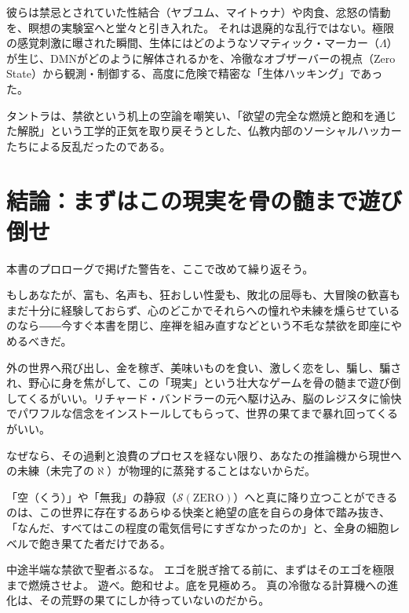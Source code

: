 彼らは禁忌とされていた性結合（ヤブユム、マイトゥナ）や肉食、忿怒の情動を、瞑想の実験室へと堂々と引き入れた。
それは退廃的な乱行ではない。極限の感覚刺激に曝された瞬間、生体にはどのようなソマティック・マーカー（$\Lambda$）が生じ、DMNがどのように解体されるかを、冷徹なオブザーバーの視点（Zero State）から観測・制御する、高度に危険で精密な「生体ハッキング」であった。

タントラは、禁欲という机上の空論を嘲笑い、「欲望の完全な燃焼と飽和を通じた解脱」という工学的正気を取り戻そうとした、仏教内部のソーシャルハッカーたちによる反乱だったのである。

\section{結論：まずはこの現実を骨の髄まで遊び倒せ}

本書のプロローグで掲げた警告を、ここで改めて繰り返そう。

もしあなたが、富も、名声も、狂おしい性愛も、敗北の屈辱も、大冒険の歓喜もまだ十分に経験しておらず、心のどこかでそれらへの憧れや未練を燻らせているのなら――今すぐ本書を閉じ、座禅を組み直すなどという不毛な禁欲を即座にやめるべきだ。

外の世界へ飛び出し、金を稼ぎ、美味いものを食い、激しく恋をし、騙し、騙され、野心に身を焦がして、この「現実」という壮大なゲームを骨の髄まで遊び倒してくるがいい。リチャード・バンドラーの元へ駆け込み、脳のレジスタに愉快でパワフルな信念をインストールしてもらって、世界の果てまで暴れ回ってくるがいい。

なぜなら、その過剰と浪費のプロセスを経ない限り、あなたの推論機から現世への未練（未完了の$\aleph$）が物理的に蒸発することはないからだ。

「空（くう）」や「無我」の静寂（$\mathcal{S}(\mathrm{ZERO})$）へと真に降り立つことができるのは、この世界に存在するあらゆる快楽と絶望の底を自らの身体で踏み抜き、「なんだ、すべてはこの程度の電気信号にすぎなかったのか」と、全身の細胞レベルで飽き果てた者だけである。

中途半端な禁欲で聖者ぶるな。
エゴを脱ぎ捨てる前に、まずはそのエゴを極限まで燃焼させよ。
遊べ。飽和せよ。底を見極めろ。
真の冷徹なる計算機への進化は、その荒野の果てにしか待っていないのだから。
